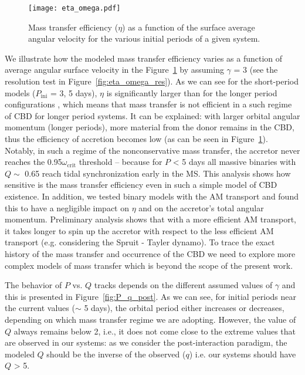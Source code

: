 \documentclass{aa}
\DeclareRobustCommand{\Figref}[1]{Figure~\ref{#1}}
\begin{document}
\begin{figure}[!hbpt]
  \centering
  \texttt{[image: eta\_omega.pdf]}
  \caption{Mass transfer efficiency ($\eta$) as a function of the surface average angular velocity for the various initial periods of a given system.}
  \label{fig:eta_omega}
\end{figure}


We illustrate how the modeled mass transfer efficiency varies as a function of average angular surface velocity in the \Figref{fig:eta_omega} by assuming $\gamma$ = 3 (see the resolution test in \Figref{fig:eta_omega_res}).
As we can see for the short-period models ($P_\mathrm{ini}$ = 3, 5 days), $\eta$ is significantly larger than for the longer period configurations \citep[as it has been also shown by][]{Sen_2022}, which means that mass transfer is not efficient in a such regime of CBD for longer period systems.
It can be explained: with larger orbital angular momentum (longer periods), more material from the donor remains in the CBD, thus the efficiency of accretion becomes low (as can be seen in \Figref{fig:eta_omega}).
Notably, in such a regime of the nonconservative mass transfer, the accretor never reaches the 0.95$\omega_\mathrm{crit}$ threshold --  because for $P$ < 5 days all massive binaries with $Q \sim$ 0.65 reach tidal synchronization early in the MS.
This analysis shows how sensitive is the mass transfer efficiency even in such a simple model of CBD existence.
In addition, we tested binary models with the \citet{fuller:19} AM transport and found this to have a negligible impact on $\eta$ and on the accretor's total angular momentum.
Preliminary analysis shows that with a more efficient AM transport, it takes longer to spin up the accretor with respect to the less efficient AM transport (e.g. considering the Spruit - Tayler dynamo).
To trace the exact history of the mass transfer and occurrence of the CBD we need to explore more complex models of mass transfer which is beyond the scope of the present work.



The behavior of $P$ vs. $Q$ tracks depends on the different assumed values of $\gamma$ and this is presented in \Figref{fig:P_q_post}.
As we can see, for initial periods near the current values ($\sim$ 5 days), the orbital period either increases or decreases, depending on which mass transfer regime we are adopting.
However, the value of $Q$ always remains below 2, i.e., it does not come close to the extreme values that are observed in our systems: as we consider the post-interaction paradigm, the modeled $Q$ should be the inverse of the observed ($q$) i.e. our systems should have $Q$ > 5.
\end{document}
